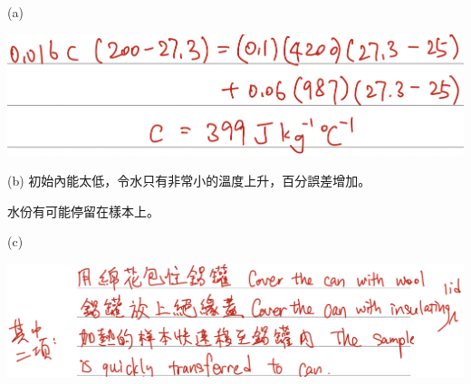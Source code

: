 {
    \clearpage
}{
    \sol\par (a){\par\centering\includegraphics[width=\textwidth]{./img/ch2_shc_lq_2024-05-16-10-40-11.png}\par}
    \par (b) 初始內能太低，令水只有非常小的溫度上升，百分誤差增加。\giveM\par
    水份有可能停留在樣本上。\giveA
    \par (c){\par\centering\includegraphics[width=\textwidth]{./img/ch2_shc_lq_2024-05-16-10-43-00.png}\par}
}

